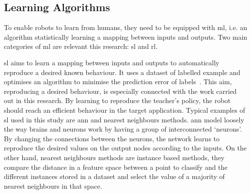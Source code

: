 %
%
%
%
%

\subsection{Learning Algorithms}
To enable robots to learn from humans, they need to be equipped with \acrfull{ml}, i.e. an algorithm statistically learning a mapping between inputs and outputs. Two main categories of \gls{ml} are relevant this research: \gls{sl} and \gls{rl}.

\gls{sl} aims to learn a mapping between inputs and outputs to automatically reproduce a desired known behaviour. It uses a dataset of labelled example and optimises an algorithm to minimise the prediction error of labels~\citep{russell2016artificial}. This aim, reproducing a desired behaviour, is especially connected with the work carried out in this research. By learning to reproduce the teacher's policy, the robot should reach an efficient behaviour in the target application. Typical examples of \gls{sl} used in this study are \gls{ann} and nearest neighbours methods. \gls{ann} model loosely the way brains and neurons work by having a group of interconnected `neurons'. By changing the connections between the neurons, the network learns to reproduce the desired values on the output nodes according to the inputs. On the other hand, nearest neighbours methods are instance based methods, they compare the distance in a feature space between a point to classify and the different instances stored in a dataset and select the value of a majority of nearest neighbours in that space.

